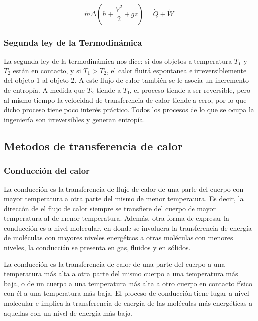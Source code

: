 \documentclass[12pt,letterpaper]{article}     %
\begin{document}
\begin{equation}
    \dot{m}\Delta(h + \frac{V^2}{2} + gz) = \dot{Q} + \dot{W}
    \label{eq:energflujoestacionario}
\end{equation}

\subsubsection{Segunda ley de la Termodinámica}

\cite[p\ 7]{Mills} La segunda ley de la termodinámica nos dice: si dos objetos a temperatura $T_{1}$ y $T_{2}$ están en contacto, y si $T_{1} > T_{2}$, el calor fluirá espontanea e irreversiblemente del objeto 1 al objeto 2. A este flujo de calor también se le asocia un incremento de entropía. A medida que $T_{2}$ tiende a $T_{1}$, el proceso tiende a ser reversible, pero al mismo tiempo la velocidad de transferencia de calor tiende a cero, por lo que dicho proceso tiene poco interés práctico. Todos los procesos de lo que se ocupa la ingeniería son irreversibles y generan entropía.



\subsection{Metodos de transferencia de calor}

\subsubsection{Conducción del calor}
La conducción es la transferencia de flujo de calor de una parte del cuerpo con mayor temperatura a otra parte del mismo de menor temperatura. Es decir, la direccón de el flujo de calor siempre se transfiere del cuerpo de mayor temperatura al de menor temperatura. Además, otra forma de expresar la conducción es a nivel molecular, en donde se involucra la transferencia de energía de moléculas con mayores niveles energétcos a otras moléculas con menores niveles, la conducción se presenta en gas, fluidos y en sólidos.

\cite[p\ 1-1-1]{Warren} La conducción es la transferencia de calor de una parte del cuerpo a una temperatura más alta a otra parte del mismo cuerpo a una temperatura más baja, o de un cuerpo a una temperatura más alta a otro cuerpo en contacto físico con él a una temperatura más baja. El proceso de conducción tiene lugar a nivel molecular e implica la transferencia de energía de las moléculas más energéticas a aquellas con un nivel de energía más bajo.
\end{document}
